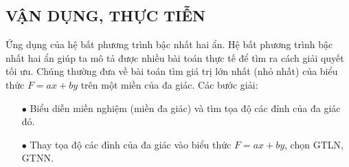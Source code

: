 \subsection{VẬN DỤNG, THỰC TIỄN}
\begin{dang}{Ứng dụng của hệ bất phương trình bậc nhất hai ẩn.}
	Hệ bất phương trình bậc nhất hai ẩn giúp ta mô tả được nhiều bài toán thực tế để tìm ra cách giải quyết tối ưu. Chúng thường đưa về bài toán tìm giá trị lớn nhất (nhỏ nhất) của biểu thức $F=ax+by$ trên một miền của đa giác. Các bước giải:
	\begin{itemize}
		\item [$\bullet$] Biểu diễn miền nghiệm (miền đa giác) và tìm tọa độ các đỉnh của đa giác đó.
		\item [$\bullet$] Thay tọa độ các đỉnh của đa giác vào biểu thức $F=ax+by$, chọn GTLN, GTNN.
	\end{itemize}
\end{dang}
